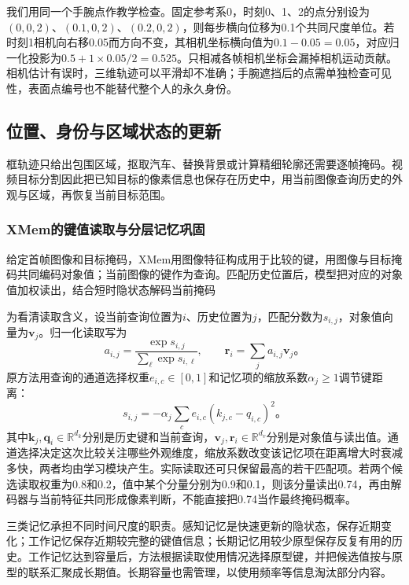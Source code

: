 我们用同一个手腕点作教学检查。固定参考系0，时刻0、1、2的点分别设为$(0,0,2)$、$(0.1,0,2)$、$(0.2,0,2)$，则每步横向位移为0.1个共同尺度单位。若时刻1相机向右移0.05而方向不变，其相机坐标横向值为$0.1-0.05=0.05$，对应归一化投影为$0.5+1\times0.05/2=0.525$。只相减各帧相机坐标会漏掉相机运动贡献。相机估计有误时，三维轨迹可以平滑却不准确；手腕遮挡后的点需单独检查可见性，表面点编号也不能替代整个人的永久身份。

\subsection{位置、身份与区域状态的更新}
\label{sec:vision-video-state-update}

框轨迹只给出包围区域，抠取汽车、替换背景或计算精细轮廓还需要逐帧掩码。视频目标分割因此把已知目标的像素信息也保存在历史中，用当前图像查询历史的外观与区域，再恢复当前目标范围。

\subsubsection{XMem的键值读取与分层记忆巩固}
\label{sec:vision-video-xmem}

给定首帧图像和目标掩码，XMem用图像特征构成用于比较的键，用图像与目标掩码共同编码对象值；当前图像的键作为查询。匹配历史位置后，模型把对应的对象值加权读出，结合短时隐状态解码当前掩码

为看清读取含义，设当前查询位置为$i$、历史位置为$j$，匹配分数为$s_{i,j}$，对象值向量为$\bm{v}_j$。归一化读取写为
\begin{equation}
  a_{i,j}=\frac{\exp s_{i,j}}{\sum_\ell\exp s_{i,\ell}},
  \qquad
  \bm{r}_i=\sum_j a_{i,j}\bm{v}_j\text{。}
  \label{eq:vision-video-memory-read}
\end{equation}
原方法用查询的通道选择权重$e_{i,c}\in[0,1]$和记忆项的缩放系数$\alpha_j\geq1$调节键距离：
\[
  s_{i,j}=-\alpha_j\sum_c e_{i,c}(k_{j,c}-q_{i,c})^2\text{。}
\]
其中$\bm{k}_j,\bm{q}_i\in\mathbb{R}^{d_k}$分别是历史键和当前查询，$\bm{v}_j,\bm{r}_i\in\mathbb{R}^{d_v}$分别是对象值与读出值。通道选择决定这次比较关注哪些外观维度，缩放系数改变该记忆项在距离增大时衰减多快，两者均由学习模块产生。实际读取还可只保留最高的若干匹配项。若两个候选读取权重为0.8和0.2，值中某个分量分别为0.9和0.1，则该分量读出0.74，再由解码器与当前特征共同形成像素判断，不能直接把0.74当作最终掩码概率。

三类记忆承担不同时间尺度的职责。感知记忆是快速更新的隐状态，保存近期变化；工作记忆保存近期较完整的键值信息；长期记忆用较少原型保存反复有用的历史。工作记忆达到容量后，方法根据读取使用情况选择原型键，并把候选值按与原型的联系汇聚成长期值。长期容量也需管理，以使用频率等信息淘汰部分内容。

